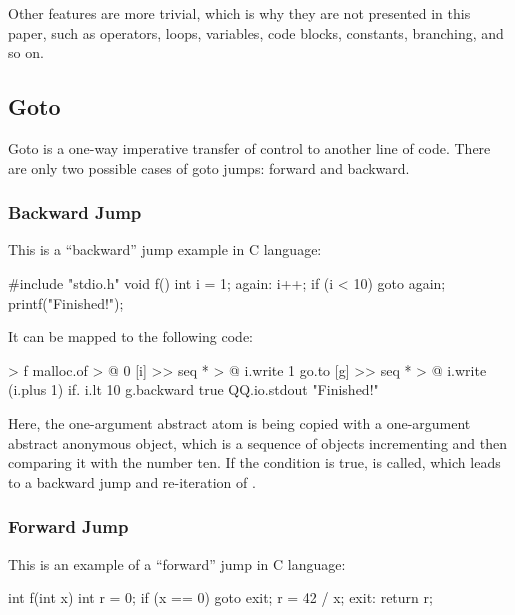 \documentclass[sigplan,nonacm]{acmart}
\begin{document}
Other features are more trivial, which is why they are not presented in this paper, such as operators, loops, variables, code blocks, constants, branching, and so on.

\subsection{Goto}
\label{sec:goto}

Goto is a one-way imperative transfer of control to another line of code. There are only two possible cases of goto jumps: forward and backward.

\subsubsection{Backward Jump}

This is a ``backward'' jump example in C language:

\begin{ffcode}
#include "stdio.h"
void f() {
  int i = 1;
  again:
  i++;
  if (i < 10) goto again;
  printf("Finished!");
}
\end{ffcode}

It can be mapped to the following \eolang{} code:

\begin{ffcode}
[] > f
  malloc.of > @
    0
    [i] >>
      seq * > @
        i.write 1
        go.to
          [g] >>
            seq * > @
              i.write (i.plus 1)
              if.
                i.lt 10
                g.backward
                true
        QQ.io.stdout "Finished!"
\end{ffcode}

Here, the one-argument abstract atom  is being copied with a one-argument abstract anonymous object, which is a sequence of objects incrementing  and then comparing it with the number ten.
If the condition is true,  is called, which leads to a backward jump and re-iteration of .

\subsubsection{Forward Jump}

This is an example of a ``forward'' jump in C language:

\begin{ffcode}
int f(int x) {
  int r = 0;
  if (x == 0) goto exit;
  r = 42 / x;
  exit:
  return r;
}
\end{ffcode}
\end{document}
